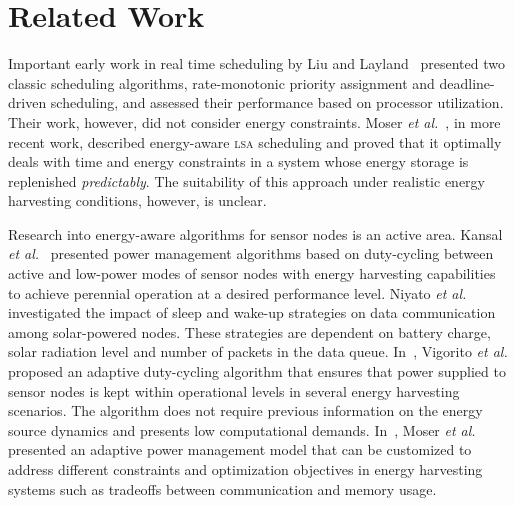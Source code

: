 \section{Related Work} \label{sec:related work}

Important early work in real time scheduling by Liu and Layland~\cite{Liu73} presented two classic scheduling algorithms,
rate-monotonic priority assignment and deadline-driven scheduling, and assessed their performance based on processor
utilization. Their work, however, did not consider energy constraints.
Moser \emph{et al.}~\cite{moser2007real}, in more recent work, described energy-aware \textsc{lsa} scheduling
and proved that it optimally deals with time and energy constraints in a system whose energy storage is replenished
\textit{predictably}. The suitability of this approach under realistic energy harvesting conditions, however, is unclear.

Research into energy-aware algorithms for sensor nodes is an active area. Kansal \emph{et al.}~\cite{kansal2007power}
presented power management algorithms based on duty-cycling between active and low-power modes of sensor nodes
with energy harvesting capabilities to achieve perennial operation at a desired performance level.
Niyato \emph{et al.}~\cite{niyato2007sleep} investigated the impact of sleep and wake-up strategies
on data communication among solar-powered nodes. These strategies are dependent on battery charge, solar radiation
level and number of packets in the data queue. In~\cite{vigorito2007adaptive}, Vigorito \emph{et al.} proposed an adaptive
duty-cycling algorithm that ensures that power supplied to sensor nodes is kept within operational levels in several
energy harvesting scenarios. The
algorithm does not require previous information on the energy source dynamics and presents low computational
demands. In~\cite{moser2007adaptive}, Moser \emph{et al.} presented an adaptive power management
model that can be customized to address different constraints and optimization objectives in energy harvesting systems
such as tradeoffs between communication and memory usage.

